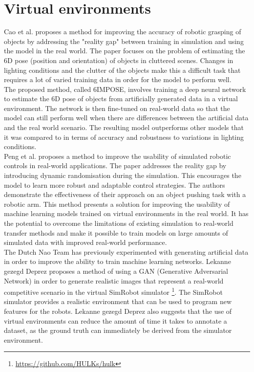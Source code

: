 \documentclass{uva-inf-bachelor-thesis}
\begin{document}
    \section{Virtual environments}
        Cao et al.\cite{6impose} proposes a method for improving the accuracy of robotic grasping of objects by addressing the "reality gap" between training in simulation and using the model in the real world. The paper focuses on the problem of estimating the 6D pose (position and orientation) of objects in cluttered scenes. Changes in lighting conditions and the clutter of the objects make this a difficult task that requires a lot of varied training data in order for the model to perform well.\\
        The proposed method, called 6IMPOSE, involves training a deep neural network to estimate the 6D pose of objects from artificially generated data in a virtual environment. The network is then fine-tuned on real-world data so that the model can still perform well when there are differences between the artificial data and the real world scenario. The resulting model outperforms other models that it was compared to in terms of accuracy and robustness to variations in lighting conditions.
        \hfill \break \\
        Peng et al.\cite{sim2real} proposes a method to improve the usability of simulated robotic controls in real-world applications. The paper addresses the reality gap by introducing dynamic randomisation during the simulation. This encourages the model to learn more robust and adaptable control strategies. The authors demonstrate the effectiveness of their approach on an object pushing task with a robotic arm. 
        This method presents a solution for improving the usability of machine learning models trained on virtual environments in the real world. It has the potential to overcome the limitations of existing simulation to real-world transfer methods and make it possible to train models on large amounts of simulated data with improved real-world performance.
        \hfill \break \\
        The Dutch Nao Team has previously experimented with generating artificial data in order to improve the ability to train machine learning networks. Lekanne gezegd Deprez \cite{hidde} proposes a method of using a GAN (Generative Adversarial Network) in order to generate realistic images that represent a real-world competitive scenario in the virtual SimRobot simulator \footnote{\url{https://github.com/HULKs/hulk}}. The SimRobot simulator provides a realistic environment that can be used to program new features for the robots. Lekanne gezegd Deprez \cite{hidde} also suggests that the use of virtual environments can reduce the amount of time it takes to annotate a dataset, as the ground truth can immediately be derived from the simulator environment. 
\end{document}

